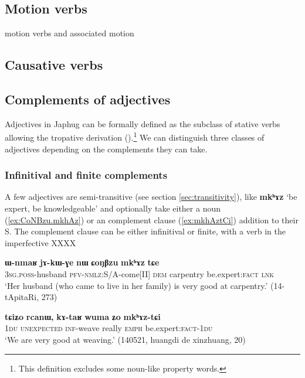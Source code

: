 \documentclass[oldfontcommands,oneside,a4paper,11pt]{article}
\newcommand{\ipa}[1]{\textbf{\phon#1}} %
\newcommand{\jpg}[2]{\ipa{#1} `#2'} %
\begin{document}
  \subsection{Motion verbs}
  
motion verbs and associated motion   \citet{jacques13harmonization}
  
\subsection{Causative verbs}



\subsection{Complements of adjectives} \label{sec:adj}
Adjectives in Japhug can be formally defined as the subclass of stative verbs allowing the tropative derivation (\citealt{jacques13tropative}).\footnote{This definition excludes some noun-like property words.} We can distinguish three classes of adjectives depending on the complements they can take.


\subsubsection{Infinitival and finite complements}
A few adjectives are semi-transitive (see section \ref{sec:transitivity}), like \jpg{mkʰɤz}{be expert, be knowledgeable} and optionally take either a noun (\ref{ex:CoNBzu.mkhAz}) or an complement clause (\ref{ex:mkhAztCi}) addition to their S. The complement clause can be either infinitival or finite, with a verb in the imperfective XXXX

\begin{exe}
\ex \label{ex:CoNBzu.mkhAz}
\gll 
\ipa{ɯ-nmaʁ} 	\ipa{jɤ-kɯ-ɣe} 	\ipa{nɯ} 	\ipa{ɕoŋβzu} 	\ipa{mkʰɤz} 	\ipa{tɕe} \\
\textsc{3sg.poss}-husband \textsc{pfv-nmlz}:S/A-come[II] \textsc{dem} carpentry be.expert:\textsc{fact} \textsc{lnk} \\
\glt `Her husband (who came to live in her family) is very good at carpentry.' (14-tApitaRi, 273)
\end{exe}

\begin{exe}
\ex \label{ex:mkhAztCi}
\gll \ipa{tɕiʑo} 	\ipa{rcanɯ,} 	\ipa{kɤ-taʁ} 	\ipa{wuma} 	\ipa{ʑo} 	\ipa{mkʰɤz-tɕi} 	 \\
\textsc{1du}  \textsc{unexpected} \textsc{inf}-weave really \textsc{emph} be.expert:\textsc{fact}-\textsc{1du} \\
\glt `We are very good at weaving.' (140521, huangdi de xinzhuang, 20)
\end{exe}
\end{document}
